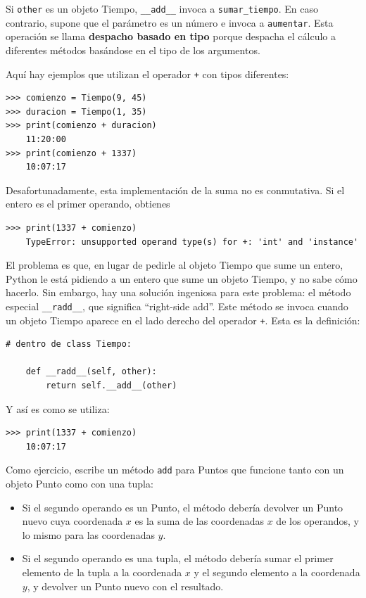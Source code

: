 \documentclass[10pt]{book}
\begin{document}
Si {\tt other} es un objeto Tiempo, \verb"__add__" invoca a
\verb"sumar_tiempo".  En caso contrario, supone que el parámetro
es un número e invoca a {\tt aumentar}.  Esta operación se
llama {\bf despacho basado en tipo} porque despacha el
cálculo a diferentes métodos basándose en el tipo de los
argumentos.

Aquí hay ejemplos que utilizan el operador {\tt +} con tipos
diferentes:

\begin{verbatim}
>>> comienzo = Tiempo(9, 45)
>>> duracion = Tiempo(1, 35)
>>> print(comienzo + duracion)
    11:20:00
>>> print(comienzo + 1337)
    10:07:17
\end{verbatim}
%
Desafortunadamente, esta implementación de la suma no es conmutativa.
Si el entero es el primer operando, obtienes

\begin{verbatim}
>>> print(1337 + comienzo)
    TypeError: unsupported operand type(s) for +: 'int' and 'instance'
\end{verbatim}
%
El problema es que, en lugar de pedirle al objeto Tiempo que sume un entero,
Python le está pidiendo a un entero que sume un objeto Tiempo, y no sabe
cómo hacerlo.  Sin embargo, hay una solución ingeniosa para este problema: el
método especial \verb"__radd__", que significa ``right-side add''.
Este método se invoca cuando un objeto Tiempo aparece en el lado derecho del
operador {\tt +}.  Esta es la definición:

\begin{verbatim}
# dentro de class Tiempo:

    def __radd__(self, other):
        return self.__add__(other)
\end{verbatim}
%
Y así es como se utiliza:

\begin{verbatim}
>>> print(1337 + comienzo)
    10:07:17
\end{verbatim}
%

Como ejercicio, escribe un método {\tt add} para Puntos que funcione tanto con
un objeto Punto como con una tupla:

\begin{itemize}

\item Si el segundo operando es un Punto, el método debería devolver un
Punto nuevo cuya coordenada $x$ es la suma de las coordenadas $x$ de los
operandos, y lo mismo para las coordenadas $y$.

\item Si el segundo operando es una tupla, el método debería sumar el
primer elemento de la tupla a la coordenada $x$ y el segundo
elemento a la coordenada $y$, y devolver un Punto nuevo con el resultado.

\end{itemize}
\end{document}

